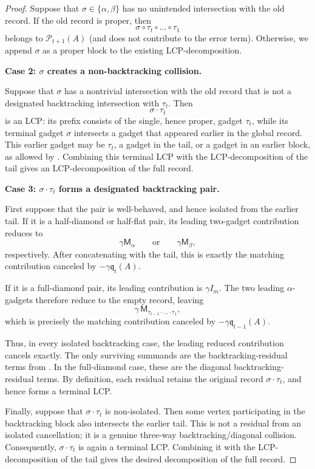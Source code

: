 \documentclass[12pt]{article}
\def \al {\alpha}
\newcommand{\calP}{\mathcal{P}}
\newcommand{\cm}{\mathsf{M} }
\newcommand{\q}{\mathfrak q}
\begin{document}
\begin{proof}
Suppose that \(\sigma \in \{\al,\beta\} \) has no unintended intersection with the old
record. If the old record is proper, then
\[
    \sigma\circ\tau_t\circ\dots\circ\tau_1
\]
belongs to \(\calP_{t+1}(A)\) (and does not contribute to the error term). Otherwise, we append \(\sigma\) as a proper
block to the existing LCP-decomposition.  

\medskip
\noindent
\textbf{Case 2: \(\sigma\) creates a non-backtracking collision.}

Suppose that \(\sigma\) has a nontrivial intersection with the old record
that is not a designated backtracking intersection with \(\tau_t\). Then
\[
    \sigma\cdot\tau_t
\]
is an LCP: its prefix consists of the single, hence proper, gadget
\(\tau_t\), while its terminal gadget \(\sigma\) intersects a gadget that
appeared earlier in the global record. This earlier gadget may be
\(\tau_t\), a gadget in the tail, or a gadget in an earlier block, as
allowed by . Combining this terminal LCP
with the LCP-decomposition of the tail gives an LCP-decomposition of the
full record.

\medskip
\noindent
\textbf{Case 3: \(\sigma\cdot\tau_t\) forms a designated backtracking pair.}

First suppose that the pair is well-behaved, and hence isolated from the
earlier tail. If it is a half-diamond or half-flat pair, its leading
two-gadget contribution reduces to
\[
    \gamma\cm_\alpha
    \qquad\text{or}\qquad
    \gamma\cm_\beta,
\]
respectively. After concatenating with the tail, this is exactly the
matching contribution canceled by \(-\gamma\q_t(A)\).

If it is a full-diamond pair, its leading contribution is
\(\gamma I_m\). The two leading \(\alpha\)-gadgets therefore reduce to the
empty record, leaving
\[
    \gamma\,
    \cm_{\tau_{t-1}\cdot\dots\cdot\tau_1},
\]
which is precisely the
matching contribution canceled by \(-\gamma\q_{t-1}(A)\).

Thus, in every isolated backtracking case, the leading reduced
contribution cancels exactly. The only surviving summands are the
backtracking-residual terms from
. In the full-diamond case, these are the
diagonal backtracking-residual terms. By definition, each residual retains
the original record \(\sigma\cdot\tau_t\), and hence forms a terminal LCP.

Finally, suppose that \(\sigma\cdot\tau_t\) is non-isolated. Then some
vertex participating in the backtracking block also intersects the earlier
tail. This is not a residual from an isolated cancellation; it is a genuine
three-way backtracking/diagonal collision. Consequently,
\(\sigma\cdot\tau_t\) is again a terminal LCP. Combining it with the
LCP-decomposition of the tail gives the desired decomposition of the full
record.


\end{proof}
\end{document}
